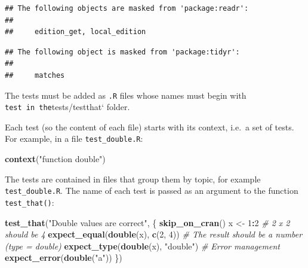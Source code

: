 \documentclass[
  12pt,
  american,
  a4paper,
  extrafontsizes,onecolumn,openright
  ]{memoir}
\newenvironment{Shaded}{\begin{snugshade}}{\end{snugshade}}
\newcommand{\CommentTok}[1]{\textcolor[rgb]{0.56,0.35,0.01}{\textit{#1}}}
\newcommand{\DecValTok}[1]{\textcolor[rgb]{0.00,0.00,0.81}{#1}}
\newcommand{\FunctionTok}[1]{\textcolor[rgb]{0.13,0.29,0.53}{\textbf{#1}}}
\newcommand{\NormalTok}[1]{#1}
\newcommand{\OtherTok}[1]{\textcolor[rgb]{0.56,0.35,0.01}{#1}}
\newcommand{\SpecialCharTok}[1]{\textcolor[rgb]{0.81,0.36,0.00}{\textbf{#1}}}
\newcommand{\StringTok}[1]{\textcolor[rgb]{0.31,0.60,0.02}{#1}}
\begin{document}
\begin{verbatim}
## The following objects are masked from 'package:readr':
## 
##     edition_get, local_edition
\end{verbatim}

\begin{verbatim}
## The following object is masked from 'package:tidyr':
## 
##     matches
\end{verbatim}

\normalsize

The tests must be added as \texttt{.R} files whose names must begin with \texttt{test\textquotesingle{}\ in\ the}tests/testthat` folder.

Each test (so the content of each file) starts with its context, i.e.~a set of tests. For example, in a file \texttt{test\_double.R}:

\scriptsize

\begin{Shaded}
\begin{Highlighting}[]
\FunctionTok{context}\NormalTok{(}\StringTok{"function double"}\NormalTok{)}
\end{Highlighting}
\end{Shaded}

\normalsize

The tests are contained in files that group them by topic, for example \texttt{test\_double.R}.
The name of each test is passed as an argument to the function \texttt{test\_that()}:

\scriptsize

\begin{Shaded}
\begin{Highlighting}[]
\FunctionTok{test\_that}\NormalTok{(}\StringTok{"Double values are correct"}\NormalTok{, \{}
    \FunctionTok{skip\_on\_cran}\NormalTok{()}
\NormalTok{    x }\OtherTok{\textless{}{-}} \DecValTok{1}\SpecialCharTok{:}\DecValTok{2}
    \CommentTok{\# 2 x 2 should be 4}
    \FunctionTok{expect\_equal}\NormalTok{(}\FunctionTok{double}\NormalTok{(x), }\FunctionTok{c}\NormalTok{(}\DecValTok{2}\NormalTok{, }\DecValTok{4}\NormalTok{))}
    \CommentTok{\# The result should be a number (type = \textquotesingle{}double\textquotesingle{})}
    \FunctionTok{expect\_type}\NormalTok{(}\FunctionTok{double}\NormalTok{(x), }\StringTok{"double"}\NormalTok{)}
    \CommentTok{\# Error management}
    \FunctionTok{expect\_error}\NormalTok{(}\FunctionTok{double}\NormalTok{(}\StringTok{"a"}\NormalTok{))}
\NormalTok{\})}
\end{Highlighting}
\end{Shaded}
\end{document}
